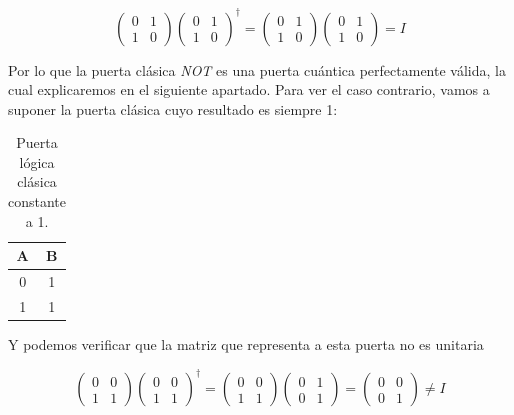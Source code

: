 \documentclass{article}
\numberwithin{equation}{section} %
\begin{document}
    \begin{equation*}
        \begin{pmatrix}
            0 & 1 \\
            1 & 0
        \end{pmatrix} \begin{pmatrix}
            0 & 1 \\
            1 & 0
        \end{pmatrix} ^ {\dagger} = \begin{pmatrix}
            0 & 1 \\
            1 & 0
        \end{pmatrix} \begin{pmatrix}
            0 & 1 \\
            1 & 0
        \end{pmatrix} = I
    \end{equation*}

    \vspace{2.5mm}

    Por lo que la puerta clásica \textit{NOT} es una puerta cuántica perfectamente válida, la cual explicaremos en el siguiente apartado. Para ver el caso contrario, vamos a suponer la puerta clásica cuyo resultado es siempre 1:
    
    \begin{table}[h!]
        \centering
        \begin{tabular}{|c|c|}
            \hline
            A & B \\
            \hline
            0 & 1 \\
            1 & 1 \\
            \hline
        \end{tabular}
        \caption{Puerta lógica clásica constante a 1.}
        \label{table: puerta_clasica_todo_1}
    \end{table}

    Y  podemos verificar que la matriz que representa a esta puerta no es unitaria
        
    \begin{equation*}
        \begin{pmatrix}
            0 & 0 \\
            1 & 1
        \end{pmatrix} \begin{pmatrix}
            0 & 0 \\
            1 & 1
        \end{pmatrix} ^ {\dagger} = \begin{pmatrix}
            0 & 0 \\
            1 & 1
        \end{pmatrix} \begin{pmatrix}
            0 & 1 \\
            0 & 1
        \end{pmatrix} =  \begin{pmatrix}
            0 & 0 \\
            0 & 1
        \end{pmatrix} \neq I
    \end{equation*}
\end{document}

